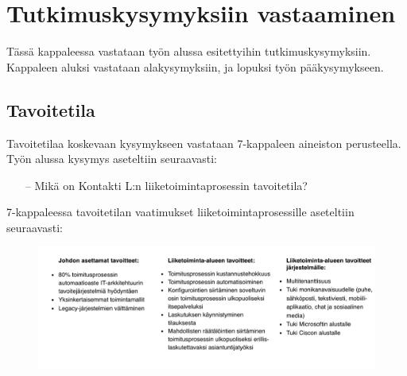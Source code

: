 \documentclass[finnish,12pt,a4paper,pdftex]{article}
\begin{document}
\clearpage

\section{Tutkimuskysymyksiin vastaaminen}
Tässä kappaleessa vastataan työn alussa esitettyihin tutkimuskysymyksiin. Kappaleen aluksi vastataan alakysymyksiin, ja lopuksi työn pääkysymykseen.

\subsection{Tavoitetila}

Tavoitetilaa koskevaan kysymykseen vastataan 7-kappaleen aineiston perusteella. Työn alussa kysymys aseteltiin seuraavasti:
\begin{itemize}
    \item [--] Mikä on Kontakti L:n liiketoimintaprosessin tavoitetila?
\end{itemize}

7-kappaleessa tavoitetilan vaatimukset liiketoimintaprosessille aseteltiin seuraavasti:\\
\begin{figure}[!h]
    \centering
    \includegraphics[scale=0.8]{images/tavoitteett.pdf}
    \label{fig:tavoitteet}
\end{figure}

\end{document}
